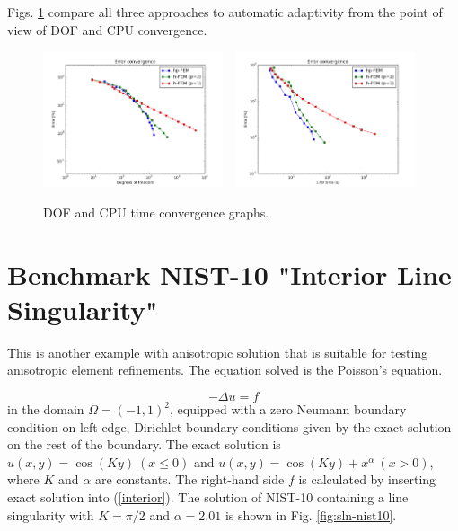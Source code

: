 \documentclass[12pt]{elsarticle}
\begin{document}
Figs. \ref{fig:nist-9-conv} compare all
three approaches to automatic adaptivity from the point
of view of DOF and CPU convergence.

\begin{figure}[!ht]
\centering
\includegraphics[height=4cm]{nist/nist-9/conv_dof_aniso.png}\ \
\includegraphics[height=4cm]{nist/nist-9/conv_cpu_aniso.png}
\caption{DOF and CPU time convergence graphs.}
\label{fig:nist-9-conv}
\end{figure}


\section{Benchmark NIST-10 "Interior Line Singularity"}
\label{sec:bench-10}

This is another example with anisotropic solution that is suitable for testing
anisotropic element refinements. The equation solved is the Poisson's equation.

\begin{equation} \label{interior}
-\Delta u = f
\end{equation}
in the domain $\Omega = (-1, 1)^2$, equipped with a zero
Neumann boundary condition on left edge, Dirichlet boundary
conditions given by the exact solution on the rest of the boundary.
The exact solution is
$u(x,y) = \cos(Ky)\ (x \le 0)$ and $u(x,y) = \cos(Ky) + x^{\alpha}\ (x > 0)$,
where $K$ and $\alpha$ are constants.
The right-hand side $f$ is calculated by inserting exact solution into (\ref{interior}).
The solution of NIST-10 containing a line singularity with $K = \pi/2$ and
$\alpha = 2.01$ is shown in Fig. \ref{fig:sln-nist10}.
\end{document}
